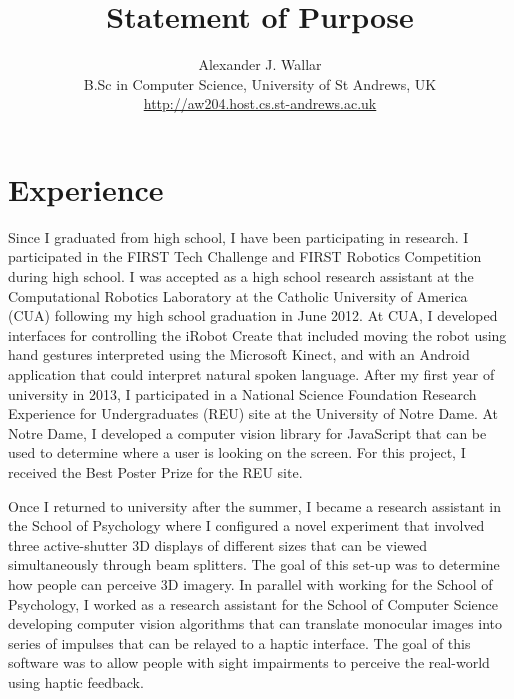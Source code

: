 \documentclass{article}
\begin{document}
\setlength{\parskip}{4pt} %

\title{Statement of Purpose}

\author{Alexander J. Wallar \\ B.Sc in Computer Science, University of St Andrews, UK
\\ \url{http://aw204.host.cs.st-andrews.ac.uk}}

\maketitle

\section{Experience}

Since I graduated from high school, I have been participating in research. I
participated in the FIRST Tech Challenge and FIRST Robotics Competition during
high school. I was accepted as a high school research assistant at the
Computational Robotics Laboratory at the Catholic University of America (CUA)
following my high school graduation in June 2012.  At CUA, I developed
interfaces for controlling the iRobot Create that included moving the robot
using hand gestures interpreted using the Microsoft Kinect, and with an Android
application that could interpret natural spoken language.  After my first year
of university in 2013, I participated in a National Science Foundation Research
Experience for Undergraduates (REU) site at the University of Notre Dame. At
Notre Dame, I developed a computer vision library for JavaScript that can be
used to determine where a user is looking on the screen.  For this project, I
received the Best Poster Prize for the REU site.

Once I returned to university after the summer, I became a research assistant
in the School of Psychology where I configured a novel experiment that involved
three active-shutter 3D displays of different sizes that can be viewed
simultaneously through beam splitters.  The goal of this set-up was to
determine how people can perceive 3D imagery. In parallel with working for the
School of Psychology, I worked as a research assistant for the School of
Computer Science developing computer vision algorithms that can translate
monocular images into series of impulses that can be relayed to a haptic
interface. The goal of this software was to allow people with sight impairments
to perceive the real-world using haptic feedback.
\end{document}
